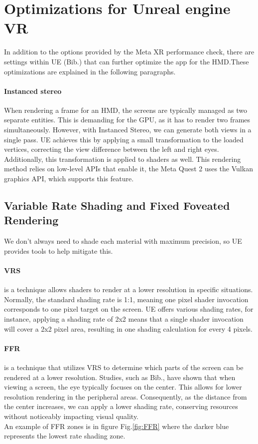 \section{Optimizations for Unreal engine VR}
\noindent
In addition to the options provided by the Meta XR performance check, there are settings within \ac{UE} (Bib.\cite{UEperformance}) that can further optimize the app for the \ac{HMD}.These optimizations are explained in the following paragraphs.

\paragraph{Instanced stereo}
When rendering a frame for an \ac{HMD}, the screens are typically managed as two separate entities. This is demanding for the GPU, as it has to render two frames simultaneously.
However, with Instanced Stereo, we can generate both views in a single pass. \ac{UE} achieves this by applying a small transformation to the loaded vertices, correcting the view difference between the left and right eyes. Additionally, this transformation is applied to shaders as well.
This rendering method relies on low-level \ac{API}s that enable it, the Meta Quest 2 uses the Vulkan graphics \ac{API}, which supports this feature.

\subsection{Variable Rate Shading and Fixed Foveated Rendering}
\noindent
We don’t always need to shade each material with maximum precision, so \ac{UE} provides tools to help mitigate this.

\paragraph{\ac{VRS}}
is a technique allows shaders to render at a lower resolution in specific situations.
Normally, the standard shading rate is 1:1, meaning one pixel shader invocation corresponds to one pixel target on the screen.
\ac{UE} offers various shading rates, for instance, applying a shading rate of 2x2 means that a single shader invocation will cover a 2x2 pixel area, resulting in one shading calculation for every 4 pixels.

\paragraph{\ac{FFR}}
is a technique that utilizes \ac{VRS} to determine which parts of the screen can be rendered at a lower resolution.
Studies, such as Bib.\cite{eye}, have shown that when viewing a screen, the eye typically focuses on the center.
This allows for lower resolution rendering in the peripheral areas. Consequently, as the distance from the center increases, we can apply a lower shading rate, conserving resources without noticeably impacting visual quality.\\
An example of FFR zones is in figure Fig.\ref{fig:FFR} where the darker blue represents the lowest rate shading zone.



